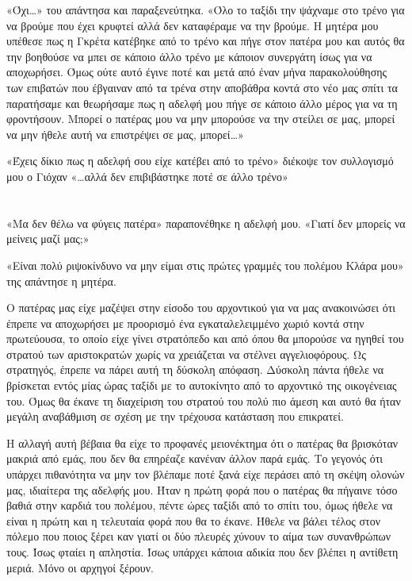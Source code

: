 \documentclass[12pt,twoside, openany]{book}
\begin{document}
«Όχι…» του απάντησα και παραξενεύτηκα. «Όλο το ταξίδι την ψάχναμε στο τρένο για να βρούμε που έχει κρυφτεί αλλά δεν καταφέραμε να την βρούμε. Η μητέρα μου υπέθεσε πως η Γκρέτα κατέβηκε από το τρένο και πήγε στον πατέρα μου και αυτός θα την βοηθούσε να μπει σε κάποιο άλλο τρένο με κάποιον συνεργάτη ίσως για να αποχωρήσει. Όμως ούτε αυτό έγινε ποτέ και μετά από έναν μήνα παρακολούθησης των επιβατών που έβγαιναν από τα τρένα στην αποβάθρα κοντά στο νέο μας σπίτι τα παρατήσαμε και θεωρήσαμε πως η αδελφή μου πήγε σε κάποιο άλλο μέρος για να τη φροντήσουν. Μπορεί ο πατέρας μου να μην μπορούσε να την στείλει σε μας, μπορεί να μην ήθελε αυτή να επιστρέψει σε μας, μπορεί…»

«Έχεις δίκιο πως η αδελφή σου είχε κατέβει από το τρένο» διέκοψε τον συλλογισμό μου ο Γιόχαν «…αλλά δεν επιβιβάστηκε ποτέ σε άλλο τρένο»


\chapter{}


«Μα δεν θέλω να φύγεις πατέρα» παραπονέθηκε η αδελφή μου. «Γιατί δεν μπορείς να μείνεις μαζί μας;»

«Είναι πολύ ριψοκίνδυνο να μην είμαι στις πρώτες γραμμές του πολέμου Κλάρα μου» της απάντησε η μητέρα.

Ο πατέρας μας είχε μαζέψει στην είσοδο του αρχοντικού για να μας ανακοινώσει ότι έπρεπε να αποχωρήσει με προορισμό ένα εγκαταλελειμμένο χωριό κοντά στην πρωτεύουσα, το οποίο είχε γίνει στρατόπεδο και από όπου θα μπορούσε να ηγηθεί του στρατού των αριστοκρατών χωρίς να χρειάζεται να στέλνει αγγελιοφόρους. Ως στρατηγός, έπρεπε να πάρει αυτή τη δύσκολη απόφαση. Δύσκολη πάντα ήθελε να βρίσκεται εντός μίας ώρας ταξίδι με το αυτοκίνητο από το αρχοντικό της οικογένειας του. Όμως θα έκανε τη διαχείριση του στρατού του πολύ πιο άμεση και αυτό θα ήταν μεγάλη αναβάθμιση σε σχέση με την τρέχουσα κατάσταση που επικρατεί.

Η αλλαγή αυτή βέβαια θα είχε το προφανές μειονέκτημα ότι ο πατέρας θα βρισκόταν μακριά από εμάς, που δεν θα επηρέαζε κανέναν άλλον παρά εμάς. Το γεγονός ότι υπάρχει πιθανότητα να μην τον βλέπαμε ποτέ ξανά είχε περάσει από τη σκέψη ολονών μας, ιδιαίτερα της αδελφής μου. Ήταν η πρώτη φορά που ο πατέρας θα πήγαινε τόσο βαθιά στην καρδιά του πολέμου, πέντε ώρες ταξίδι από το σπίτι του, όμως ήθελε να είναι η πρώτη και η τελευταία φορά που θα το έκανε. Ήθελε να βάλει τέλος στον πόλεμο που ποιος ξέρει καν γιατί οι δύο πλευρές χύνουν το αίμα των συνανθρώπων τους. Ίσως φταίει η απληστία. Ίσως υπάρχει κάποια αδικία που δεν βλέπει η αντίθετη μεριά. Μόνο οι αρχηγοί ξέρουν.
\end{document}
